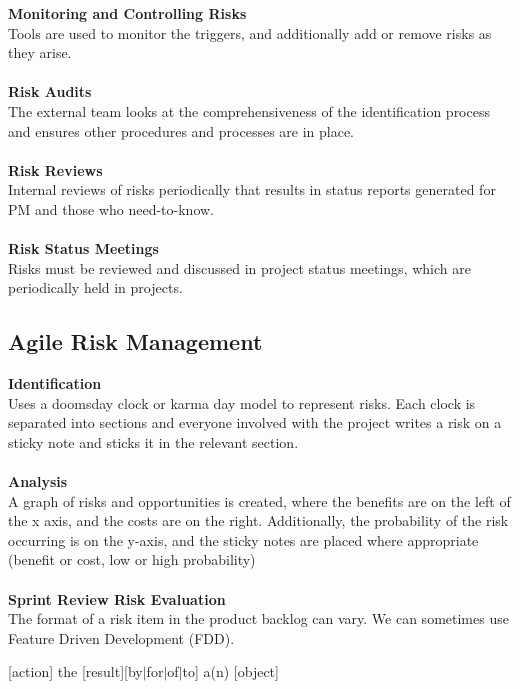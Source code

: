 \documentclass[a4paper,10pt]{article}
\begin{document}
\textcolor{BlueGreen}{\textbf{Monitoring and Controlling Risks}} \\
Tools are used to monitor the triggers, and additionally add or remove risks as they arise. \\\\
\textbf{Risk Audits} \\
The external team looks at the comprehensiveness of the identification process and ensures other procedures and processes are in place. \\\\
\textbf{Risk Reviews} \\
Internal reviews of risks periodically that results in status reports generated for PM and those who need-to-know. \\\\
\textbf{Risk Status Meetings} \\
Risks must be reviewed and discussed in project status meetings, which are periodically held in projects. 
\subsection*{Agile Risk Management}
\textcolor{BlueGreen}{\textbf{Identification}} \\
Uses a doomsday clock or karma day model to represent risks. Each clock is separated into sections and everyone involved with the project writes a risk on a sticky note and sticks it in the relevant section. \\\\
\textcolor{BlueGreen}{\textbf{Analysis}} \\
A graph of risks and opportunities is created, where the benefits are on the left of the x axis, and the costs are on the right. Additionally, the probability of the risk occurring is on the y-axis, and the sticky notes are placed where appropriate (benefit or cost, low or high probability) \\\\
\textcolor{BlueGreen}{\textbf{Sprint Review Risk Evaluation}} \\
The format of a risk item in the product backlog can vary. We can sometimes use Feature Driven Development (FDD). 
\begin{center}
	[action] the [result][by$|$for$|$of$|$to] a(n) [object]
\end{center}
\newpage
\end{document}
